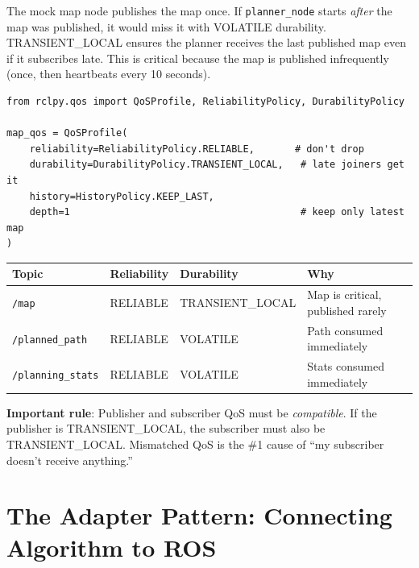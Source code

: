 \documentclass[12pt, a4paper]{article}
\begin{document}
\begin{keybox}
The mock map node publishes the map once. If \texttt{planner\_node}
starts \emph{after} the map was published, it would miss it with
VOLATILE durability. TRANSIENT\_LOCAL ensures the planner receives
the last published map even if it subscribes late. This is critical
because the map is published infrequently (once, then heartbeats every
10 seconds).
\end{keybox}

\begin{lstlisting}[style=python, caption={QoS profile for map subscription (planner\_node.py)}]
from rclpy.qos import QoSProfile, ReliabilityPolicy, DurabilityPolicy

map_qos = QoSProfile(
    reliability=ReliabilityPolicy.RELIABLE,       # don't drop
    durability=DurabilityPolicy.TRANSIENT_LOCAL,   # late joiners get it
    history=HistoryPolicy.KEEP_LAST,
    depth=1                                        # keep only latest map
)
\end{lstlisting}

\begin{center}
\begin{tabular}{llll}
    \toprule
    \textbf{Topic} & \textbf{Reliability} & \textbf{Durability} & \textbf{Why} \\
    \midrule
    \texttt{/map} & RELIABLE & TRANSIENT\_LOCAL & Map is critical, published rarely \\
    \texttt{/planned\_path} & RELIABLE & VOLATILE & Path consumed immediately \\
    \texttt{/planning\_stats} & RELIABLE & VOLATILE & Stats consumed immediately \\
    \bottomrule
\end{tabular}
\end{center}

\textbf{Important rule}: Publisher and subscriber QoS must be \emph{compatible}.
If the publisher is TRANSIENT\_LOCAL, the subscriber must also be
TRANSIENT\_LOCAL. Mismatched QoS is the \#1 cause of ``my subscriber
doesn't receive anything.''


\section{The Adapter Pattern: Connecting Algorithm to ROS}
\label{sec:adapters}
\end{document}
